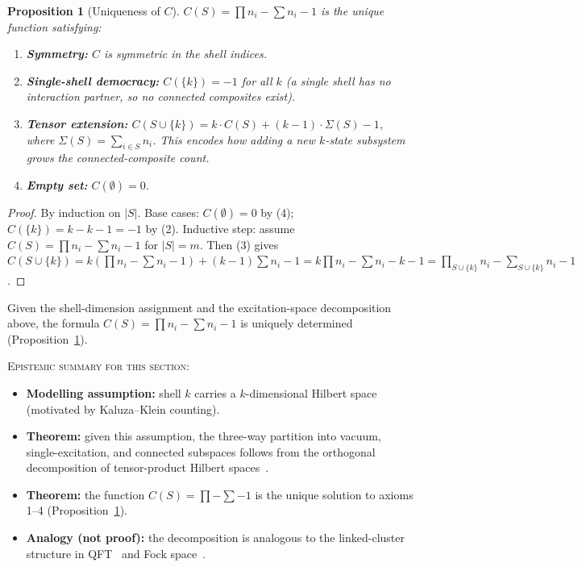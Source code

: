 \documentclass[12pt]{article}
\newtheorem{proposition}[theorem]{Proposition}
\begin{document}
\begin{proposition}[Uniqueness of $C$]\label{prop:uniqueness}
$C(S) = \prod n_i - \sum n_i - 1$ is the unique function satisfying:
\begin{enumerate}
    \item \textbf{Symmetry:} $C$ is symmetric in the shell indices.
    \item \textbf{Single-shell democracy:} $C(\{k\}) = -1$ for all $k$ (a single shell has no interaction partner, so no connected composites exist).
    \item \textbf{Tensor extension:} $C(S \cup \{k\}) = k \cdot C(S) + (k-1) \cdot \Sigma(S) - 1$, where $\Sigma(S) = \sum_{i \in S} n_i$. This encodes how adding a new $k$-state subsystem grows the connected-composite count.
    \item \textbf{Empty set:} $C(\emptyset) = 0$.
\end{enumerate}
\end{proposition}

\begin{proof}
By induction on $|S|$. Base cases: $C(\emptyset) = 0$ by (4); $C(\{k\}) = k - k - 1 = -1$ by (2). Inductive step: assume $C(S) = \prod n_i - \sum n_i - 1$ for $|S| = m$. Then (3) gives $C(S \cup \{k\}) = k(\prod n_i - \sum n_i - 1) + (k{-}1)\sum n_i - 1 = k\prod n_i - \sum n_i - k - 1 = \prod_{S \cup \{k\}} n_i - \sum_{S \cup \{k\}} n_i - 1$.
\end{proof}

Given the shell-dimension assignment and the excitation-space decomposition above, the formula $C(S) = \prod n_i - \sum n_i - 1$ is uniquely determined (Proposition~\ref{prop:uniqueness}).

\textsc{Epistemic summary for this section:}
\begin{itemize}
    \item \textbf{Modelling assumption:} shell $k$ carries a $k$-dimensional Hilbert space (motivated by Kaluza--Klein counting).
    \item \textbf{Theorem:} given this assumption, the three-way partition into vacuum, single-excitation, and connected subspaces follows from the orthogonal decomposition of tensor-product Hilbert spaces~\citep{ReedSimon1978, NielsenChuang2000}.
    \item \textbf{Theorem:} the function $C(S) = \prod - \sum - 1$ is the unique solution to axioms 1--4 (Proposition~\ref{prop:uniqueness}).
    \item \textbf{Analogy (not proof):} the decomposition is analogous to the linked-cluster structure in QFT~\citep{Weinberg1995} and Fock space~\citep{FetterWalecka1971}.
\end{itemize}
\end{document}

